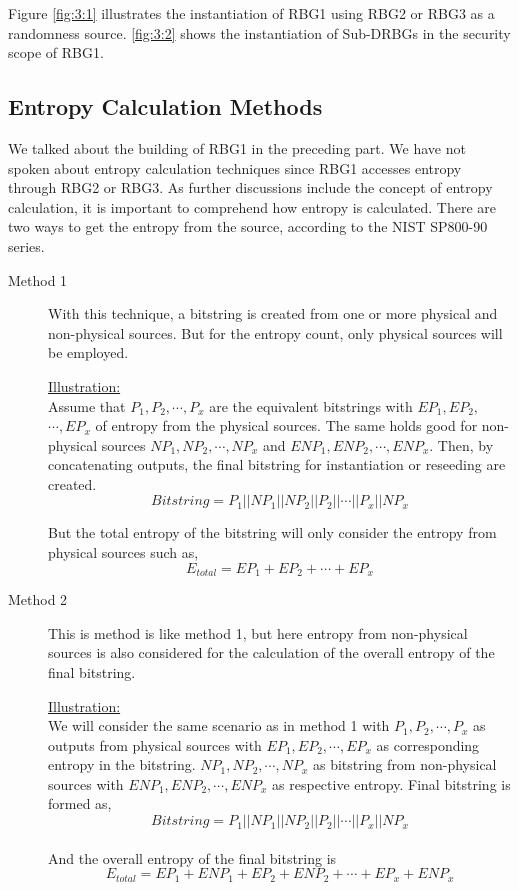 Figure \ref{fig:3:1} illustrates the instantiation of RBG1 using RBG2 or RBG3 as a randomness source. \ref{fig:3:2} shows the instantiation of Sub-DRBGs in the security scope of RBG1.

%
%
\subsection{Entropy Calculation Methods}
\label{subsec:SoA:ECM}
We talked about the building of RBG1 in the preceding part. We have not spoken about entropy calculation techniques since RBG1 accesses entropy through RBG2 or RBG3. As further discussions include the concept of entropy calculation, it is important to comprehend how entropy is calculated. There are two ways to get the entropy from the source, according to the NIST SP800-90 series. 
\begin{description}
	\item[Method 1] With this technique, a bitstring is created from one or more physical and non-physical sources. But for the entropy count, only physical sources will be employed.
	
	\underline{Illustration:}\\
	Assume that $P_{1},P_{2},\cdots,P_{x}$  are the equivalent bitstrings with $EP_{1},EP_{2},$ $\cdots,EP_{x}$  of entropy from the physical sources. The same holds good for non-physical sources $NP_{1},NP_{2},\cdots,NP_{x}$ and $ENP_{1},ENP_{2},\cdots,ENP_{x}$. Then, by concatenating outputs, the final bitstring for instantiation or reseeding are created.
	\begin{equation*}
	Bitstring = P_{1}||NP_{1}||NP_{2}||P_{2}||\cdots||P_{x}||NP_{x}
	\end{equation*}
	
	But the total entropy of the bitstring will only consider the entropy from physical sources such as,
	\begin{equation*}
	E_{total} = EP_{1} + EP_{2} + \cdots + EP_{x} 
	\end{equation*}
	\item[Method 2] This is method is like method 1, but here entropy from non-physical sources is also considered for the calculation of the overall entropy of the final bitstring.
	
	\underline{Illustration:}\\
	We will consider the same scenario as in method 1 with  $P_{1},P_{2},\cdots,P_{x}$ as outputs from physical sources with $EP_{1},EP_{2},\cdots,EP_{x}$  as corresponding entropy in the bitstring. $NP_{1},NP_{2},\cdots,NP_{x}$ as bitstring from non-physical sources with  $ENP_{1},ENP_{2},\cdots,ENP_{x}$ as respective entropy. Final bitstring is formed as,
	\begin{equation*}
	Bitstring = P_{1}||NP_{1}||NP_{2}||P_{2}||\cdots||P_{x}||NP_{x}
	\end{equation*}\\
	And the overall entropy of the final bitstring is
	\begin{equation*}
	E_{total} = EP_{1} + ENP_{1} + EP_{2} + ENP_{2} + \cdots +  EP_{x} + ENP_{x}
	\end{equation*}
\end{description}

